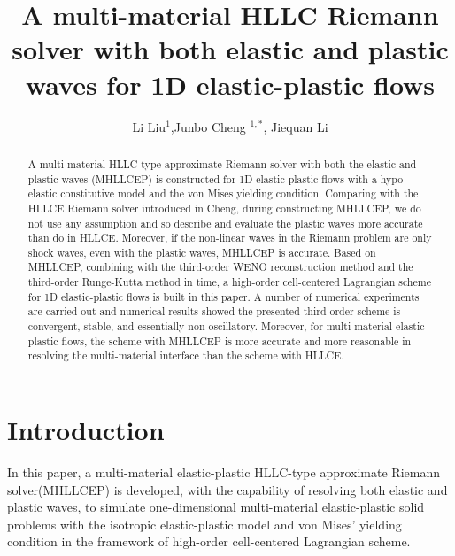 \documentclass{article}
\numberwithin{equation}{section}
\numberwithin{table}{section}
\begin{document}
\title{A multi-material HLLC Riemann solver with both elastic and plastic waves for 1D  elastic-plastic flows}
\author{Li Liu$^1$,Junbo Cheng $^{1,*}$, Jiequan Li}

\maketitle


\begin{abstract}
  A multi-material HLLC-type  approximate Riemann solver with both the elastic and plastic waves (MHLLCEP) is constructed for 1D elastic-plastic flows with a hypo-elastic constitutive model and the von Mises yielding condition. Comparing with the HLLCE Riemann solver introduced in Cheng, during constructing MHLLCEP, we do not use any assumption and so describe and evaluate the plastic waves more accurate than do in HLLCE. Moreover, if the non-linear waves in the Riemann problem are only shock waves, even with the plastic waves, MHLLCEP is accurate. Based on MHLLCEP, combining with the third-order WENO reconstruction method and the third-order Runge-Kutta method in time, a high-order cell-centered Lagrangian scheme for 1D elastic-plastic flows is built in this paper. A number of numerical experiments are carried out and numerical results showed the presented third-order scheme is convergent, stable, and essentially non-oscillatory. Moreover, for multi-material elastic-plastic flows, the scheme with MHLLCEP is more accurate and more reasonable in resolving the multi-material interface than the scheme with HLLCE.
\end{abstract}


\section{Introduction}

In this paper, a multi-material elastic-plastic HLLC-type approximate Riemann solver(MHLLCEP) is developed, with the capability of resolving both elastic and plastic waves, to simulate one-dimensional  multi-material elastic-plastic solid problems with the isotropic elastic-plastic model \cite{wilkins1963calculation} and von Mises' yielding condition in the framework of high-order cell-centered Lagrangian scheme.
\end{document}
